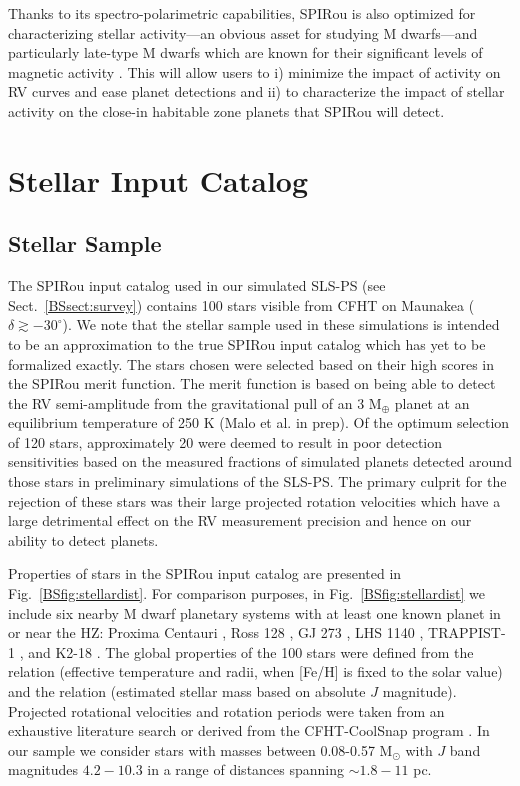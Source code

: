 Thanks to its spectro-polarimetric capabilities, SPIRou is also optimized for characterizing stellar activity---an
obvious asset for studying M dwarfs---and particularly late-type M dwarfs which are known for their significant levels
of magnetic activity \citep{west15}. This will allow users to i) minimize the impact of activity on RV curves and
ease planet detections and ii) to characterize the impact of stellar activity on the close-in habitable zone
planets that SPIRou will detect.


\section{Stellar Input Catalog} \label{BSsect:starsample}
\subsection{Stellar Sample} \label{BSsect:starsamplesub}
The SPIRou input catalog used in our simulated SLS-PS (see Sect.~\ref{BSsect:survey})
contains 100 stars visible from CFHT on Maunakea
($\delta \gtrsim -30^{\circ}$). We note that the stellar sample used in these simulations is intended to be an
approximation to the true SPIRou input catalog which has yet to be formalized exactly. The stars chosen
were selected based on their high scores in the
SPIRou merit function. The merit function is based on being able to detect the RV semi-amplitude
from the gravitational pull of an 3 M$_{\oplus}$ planet at an equilibrium temperature of 250 K (Malo et al. in prep).
Of the optimum selection of 120 stars, approximately 20 were
deemed to result in poor detection sensitivities based on 
the measured fractions of simulated planets detected around those stars in preliminary simulations
of the SLS-PS. The primary
culprit for the rejection of these stars was their large projected rotation
velocities \vsini{,} which have a large detrimental effect on the RV measurement
precision and hence on our ability to detect planets. 

Properties of stars in the SPIRou input catalog are presented in Fig.~\ref{BSfig:stellardist}.
For comparison purposes, in Fig.~\ref{BSfig:stellardist} we include six nearby M dwarf
planetary systems with at least one known planet in or near the HZ: 
Proxima Centauri \citep{angladaescude16}, Ross 128 \citep{bonfils17a},
GJ 273 \citep{astudillodefru17}, LHS 1140 \citep{dittmann17}, TRAPPIST-1 \citep{gillon17},
and K2-18 \citep{montet15, cloutier17b}.
The global properties of the 100 stars were defined from the \cite{boyajian12} relation (effective
temperature and radii, when [Fe/H] is fixed to the solar value) and the \cite{delfosse00} relation
(estimated stellar mass based on absolute $J$ magnitude).
Projected rotational velocities and rotation periods were taken
from an exhaustive literature search or derived from the CFHT-CoolSnap program
\citep{moutou17}. In our sample
we consider stars with masses between 0.08-0.57 M$_{\odot}$ with $J$ band magnitudes $4.2-10.3$ in
a range of distances spanning $\sim 1.8-11$ pc.

